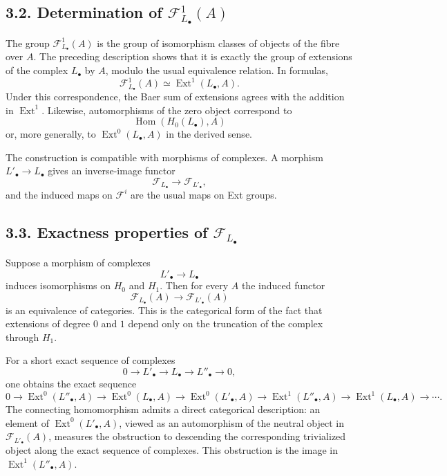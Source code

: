 \documentclass[11pt]{article}
\newcommand{\Ext}{\operatorname{Ext}}
\newcommand{\Hom}{\operatorname{Hom}}
\newcommand{\cF}{\mathcal F}
\begin{document}
\subsection*{3.2. Determination of \(\cF^1_{L_\bullet}(A)\)}

The group \(\cF^1_{L_\bullet}(A)\) is the group of isomorphism classes of objects
of the fibre over \(A\). The preceding description shows that it is exactly the
group of extensions of the complex \(L_\bullet\) by \(A\), modulo the usual
equivalence relation. In formulas,
\[
\cF^1_{L_\bullet}(A)\simeq \Ext^1(L_\bullet,A).
\]
Under this correspondence, the Baer sum of extensions agrees with the addition
in \(\Ext^1\). Likewise, automorphisms of the zero object correspond to
\[
\Hom(H_0(L_\bullet),A)
\]
or, more generally, to \(\Ext^0(L_\bullet,A)\) in the derived sense.

The construction is compatible with morphisms of complexes. A morphism
\(L'_\bullet\to L_\bullet\) gives an inverse-image functor
\[
\cF_{L_\bullet}\longrightarrow \cF_{L'_\bullet},
\]
and the induced maps on \(\cF^i\) are the usual maps on Ext groups.

\subsection*{3.3. Exactness properties of \(\cF_{L_\bullet}\)}

Suppose a morphism of complexes
\[
L'_\bullet\longrightarrow L_\bullet
\]
induces isomorphisms on \(H_0\) and \(H_1\). Then for every \(A\) the induced
functor
\[
\cF_{L_\bullet}(A)\longrightarrow \cF_{L'_\bullet}(A)
\]
is an equivalence of categories. This is the categorical form of the fact that
extensions of degree \(0\) and \(1\) depend only on the truncation of the complex
through \(H_1\).

For a short exact sequence of complexes
\[
0\longrightarrow L'_\bullet\longrightarrow L_\bullet
        \longrightarrow L''_\bullet\longrightarrow 0,
\]
one obtains the exact sequence
\[
0\to \Ext^0(L''_\bullet,A)\to \Ext^0(L_\bullet,A)
\to \Ext^0(L'_\bullet,A)
\to \Ext^1(L''_\bullet,A)\to \Ext^1(L_\bullet,A)\to\cdots .
\]
The connecting homomorphism admits a direct categorical description: an element
of \(\Ext^0(L'_\bullet,A)\), viewed as an automorphism of the neutral object in
\(\cF_{L'_\bullet}(A)\), measures the obstruction to descending the corresponding
trivialized object along the exact sequence of complexes. This obstruction is the
image in \(\Ext^1(L''_\bullet,A)\).
\end{document}
